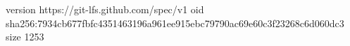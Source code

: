 version https://git-lfs.github.com/spec/v1
oid sha256:7934cb677fbfc4351463196a961ee915ebc79790ac69e60c3f23268c6d060dc3
size 1253
